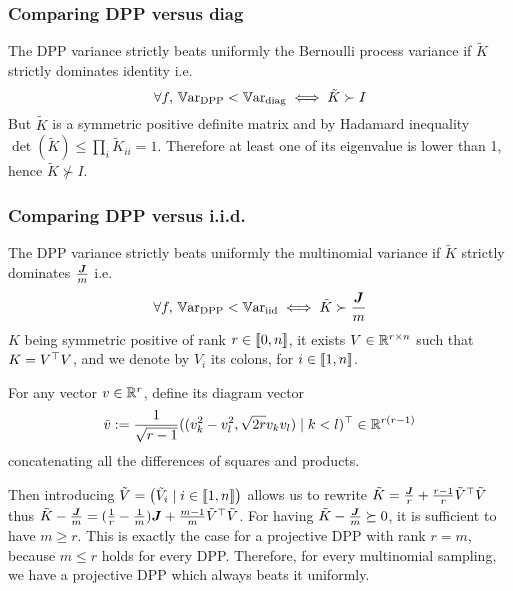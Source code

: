 \subsubsection{Comparing DPP versus diag}
The DPP variance strictly beats uniformly the Bernoulli process variance if $\tilde K$ strictly dominates identity i.e. 
\begin{equation}
	\forall f, \, \operatorname{\mathbb V ar}_{\textrm{DPP}} < \operatorname{\mathbb V ar}_{\textrm{diag}} \iff \tilde K \succ I
\end{equation}
But $\tilde K$ is a symmetric positive definite matrix and by Hadamard inequality $\det( \tilde K) \leq \prod_{i} \tilde K_{ii}= 1$. Therefore at least one of its eigenvalue is lower than 1, hence $\tilde K \nsucc I$.

\subsubsection{Comparing DPP versus i.i.d.}
The DPP variance strictly beats uniformly the multinomial variance if $\tilde K$ strictly dominates $\frac{\boldsymbol{J}}{m}$ i.e. 
\begin{equation}
	\forall f, \, \operatorname{\mathbb V ar}_{\textrm{DPP}} < \operatorname{\mathbb V ar}_{\textrm{iid}} \iff \tilde K \succ \frac{\boldsymbol{J}}{m}
\end{equation}
$K$ being symmetric positive of rank $r \in \llbracket 0,n \rrbracket$, it exists $V \in \mathbb{R}^{r \times n}$ such that $K = V^\top V$, and we denote by $V_i$ its colons, for $i \in \llbracket 1,n \rrbracket$.

For any vector $v \in \mathbb{R}^{r}$, \cite{copenhaver2013diagramvectors} define its diagram vector 
$$\tilde v :=
 \frac{1}{\sqrt{r-1}} ((v_k^{2}-v_l^{2} , \sqrt{2 r} v_k v_l ) \mid k<l)^\top \in \mathbb{R}^{r(r-1)}$$
concatenating all the differences of squares and products.

Then introducing $\tilde V = \begin{pmatrix}\tilde V_i \mid i\in\llbracket 1,n \rrbracket\end{pmatrix}
$ allows us to rewrite $\tilde K = \frac{\boldsymbol{J}}{r} + \frac{r-1}{r} \tilde V^\top \tilde V$ thus $\tilde K - \frac{\boldsymbol{J}}{m} = (\frac{1}{r}-\frac{1}{m})\boldsymbol{J} + \frac{m-1}{m} \tilde V^\top \tilde V$. For having $\tilde K - \frac{\boldsymbol{J}}{m}\succeq 0$, it is sufficient to have $m \geq r$. This is exactly the case for a projective DPP with rank $r = m$, because $m \leq r$ holds for every DPP. Therefore, for every multinomial sampling, we have a projective DPP which always beats it uniformly.





